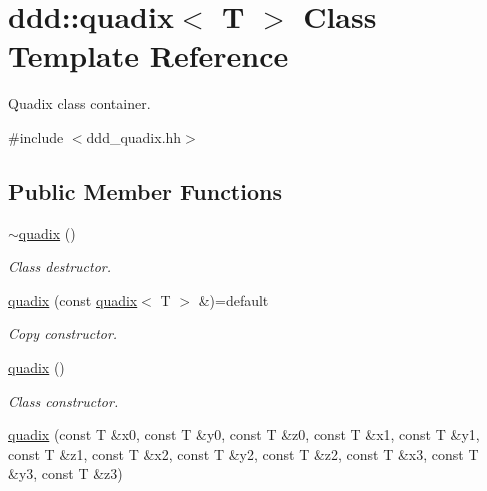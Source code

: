 \hypertarget{classddd_1_1quadix}{}\section{ddd\+:\+:quadix$<$ T $>$ Class Template Reference}
\label{classddd_1_1quadix}


Quadix class container.  




{\ttfamily \#include $<$ddd\+\_\+quadix.\+hh$>$}

\subsection*{Public Member Functions}
\begin{DoxyCompactItemize}
\item 
\mbox{\label{classddd_1_1quadix_ad751f0c150c5f86e33cc1f10d85eb933}} 
\hyperlink{classddd_1_1quadix_ad751f0c150c5f86e33cc1f10d85eb933}{$\sim$quadix} ()
\begin{DoxyCompactList}\small\item\em Class destructor. \end{DoxyCompactList}\item 
\mbox{\label{classddd_1_1quadix_ae5890ee224844b4fe85b6284b7ea71c4}} 
\hyperlink{classddd_1_1quadix_ae5890ee224844b4fe85b6284b7ea71c4}{quadix} (const \hyperlink{classddd_1_1quadix}{quadix}$<$ T $>$ \&)=default
\begin{DoxyCompactList}\small\item\em Copy constructor. \end{DoxyCompactList}\item 
\mbox{\label{classddd_1_1quadix_afb86b4382b964e20bf2c88aa9085bc06}} 
\hyperlink{classddd_1_1quadix_afb86b4382b964e20bf2c88aa9085bc06}{quadix} ()
\begin{DoxyCompactList}\small\item\em Class constructor. \end{DoxyCompactList}\item 
\mbox{\label{classddd_1_1quadix_a0ae72a0bc622fc7cad5d6780c7af8e53}} 
\hyperlink{classddd_1_1quadix_a0ae72a0bc622fc7cad5d6780c7af8e53}{quadix} (const T \&x0, const T \&y0, const T \&z0, const T \&x1, const T \&y1, const T \&z1, const T \&x2, const T \&y2, const T \&z2, const T \&x3, const T \&y3, const T \&z3)

\end{DoxyCompactItemize}
